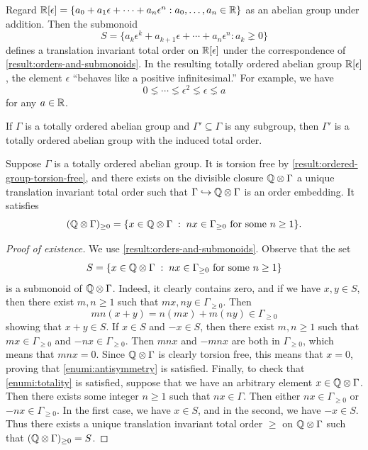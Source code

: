\begin{example}
Regard $\mathbb{R}[\epsilon] = \{ a_0 + a_1 \epsilon + \dotsb + a_n \epsilon^n : a_0, \dotsc, a_n \in \mathbb{R} \}$ as an abelian group under addition. Then the submonoid
\[ S = \{ a_k\epsilon^k + a_{k+1} \epsilon + \dotsb + a_n \epsilon^n : a_k \gneq 0 \} \]
defines a translation invariant total order on $\mathbb{R}[\epsilon]$ under the correspondence of \cref{result:orders-and-submonoids}. In the resulting totally ordered abelian group $\mathbb{R}[\epsilon]$, the element $\epsilon$ ``behaves like a positive infinitesimal.'' For example, we have 
\[ 0 \lneq \dotsb \lneq \epsilon^2 \lneq \epsilon \lneq a \]
for any $a \in \mathbb{R}$. 
\end{example}

\begin{example}
\label{example:subgroup-order}
If $\Gamma$ is a totally ordered abelian group and $\Gamma' \subseteq \Gamma$ is any subgroup, then $\Gamma'$ is a totally ordered abelian group with the induced total order. 
\end{example}

\begin{example}
\label{example:divisible-closure}
Suppose $\Gamma$ is a totally ordered abelian group. It is torsion free by \cref{result:ordered-group-torsion-free}, and there exists on the divisible closure $\mathbb{Q} \otimes \Gamma$ a unique translation invariant total order such that $\Gamma \hookrightarrow \mathbb{Q} \otimes \Gamma$ is an order embedding. It satisfies 
\[ (\mathbb{Q} \otimes \Gamma)_{\geq 0} = \{ x \in \mathbb{Q} \otimes \Gamma \; : \; nx \in \Gamma_{\geq 0} \text{ for some } n \geq 1 \}. \]
\end{example}

\begin{proof}[Proof of existence]
We use \cref{result:orders-and-submonoids}. Observe that the set 
\[ S = \{x \in \mathbb{Q} \otimes \Gamma \; : \; nx \in \Gamma_{\geq 0} \text{ for some } n \geq 1 \} \] is a submonoid of $\mathbb{Q} \otimes \Gamma$. Indeed, it clearly contains zero, and if we have $x, y \in S$, then there exist $m, n \geq 1$ such that $mx, ny \in \Gamma_{\geq 0}$. Then
\[ mn(x+y) = n(mx) + m(ny) \in \Gamma_{\geq 0} \]
showing that $x+y \in S$. If $x \in S$ and $-x \in S$, then there exist $m, n \geq 1$ such that $mx \in \Gamma_{\geq 0}$ and $-nx \in \Gamma_{\geq 0}$. Then $mnx$ and $-mnx$ are both in $\Gamma_{\geq 0}$, which means that $mnx = 0$. Since $\mathbb{Q} \otimes \Gamma$ is clearly torsion free, this means that $x  = 0$, proving that \cref{enumi:antisymmetry} is satisfied. Finally, to check that \cref{enumi:totality} is satisfied, suppose that we have an arbitrary element $x \in \mathbb{Q} \otimes \Gamma$. Then there exists some integer $n \geq 1$ such that $nx \in \Gamma$. Then either $nx \in \Gamma_{\geq 0}$ or $-nx \in \Gamma_{\geq 0}$.  In the first case, we have $x \in S$, and in the second, we have $-x \in S$. Thus there exists a unique translation invariant total order $\geq$ on $\mathbb{Q} \otimes \Gamma$ such that $(\mathbb{Q} \otimes \Gamma)_{\geq 0} = S$. 
\end{proof}

